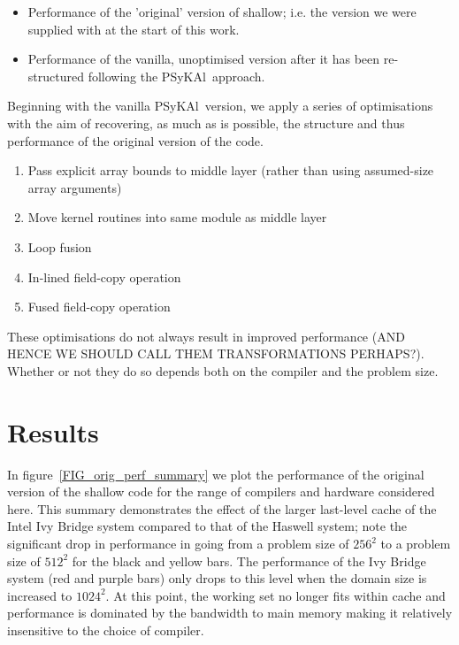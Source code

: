 \documentclass[journal]{IEEEtran}
\newcommand{\psykal}{{PS}y{KA}l\ }
\begin{document}
\begin{itemize}

\item Performance of the 'original' version of shallow; i.e. the version we
were supplied with at the start of this work.  

\item Performance of the vanilla, unoptimised version after it has been
re-structured following the \psykal approach.

\end{itemize}

Beginning with the vanilla \psykal version, we apply a series of
optimisations with the aim of recovering, as much as is possible, the
structure and thus performance of the original version of the code.

\begin{enumerate}

\item Pass explicit array bounds to middle layer (rather than using
  assumed-size array arguments)

\item Move kernel routines into same module as middle layer

\item Loop fusion

\item In-lined field-copy operation

\item Fused field-copy operation

\end{enumerate}

These optimisations do not always result in improved performance (AND
HENCE WE SHOULD CALL THEM TRANSFORMATIONS PERHAPS?). Whether or not
they do so depends both on the compiler and the problem size.

\section{Results}


In figure~\ref{FIG_orig_perf_summary} we plot the performance of the
original version of the shallow code for the range of compilers and
hardware considered here. This summary demonstrates the effect of the
larger last-level cache of the Intel Ivy Bridge system compared to
that of the Haswell system; note the significant drop in performance
in going from a problem size of $256^{2}$ to a problem size of
$512^{2}$ for the black and yellow bars. The performance of the Ivy
Bridge system (red and purple bars) only drops to this level when the
domain size is increased to $1024^{2}$. At this point, the working set
no longer fits within cache and performance is dominated by the
bandwidth to main memory making it relatively insensitive to the
choice of compiler.  
\end{document}
